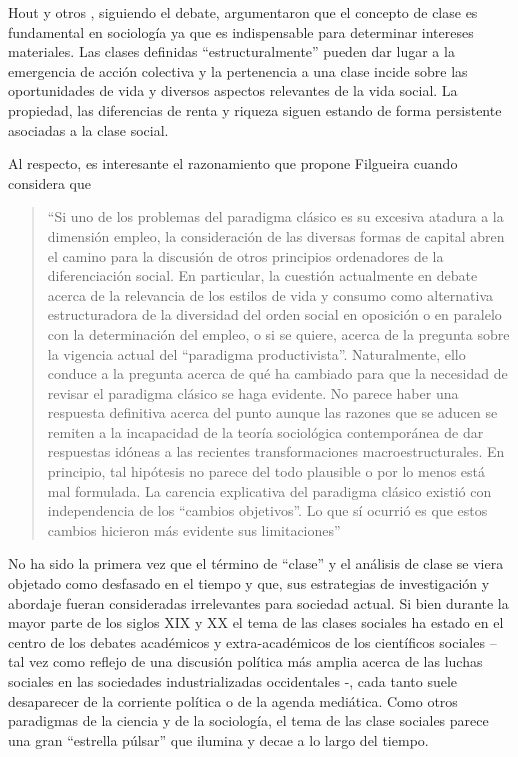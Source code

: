 \documentclass[
]{book}
\begin{document}
Hout y otros \citeyearpar{Hout1993}, siguiendo el debate, argumentaron que el concepto de clase es fundamental en sociología ya que es indispensable para determinar intereses materiales. Las clases definidas ``estructuralmente'' pueden dar lugar a la emergencia de acción colectiva y la pertenencia a una clase incide sobre las oportunidades de vida y diversos aspectos relevantes de la vida social. La propiedad, las diferencias de renta y riqueza siguen estando de forma persistente asociadas a la clase social.

Al respecto, es interesante el razonamiento que propone Filgueira cuando considera que

\begin{quote}
``Si uno de los problemas del paradigma clásico es su excesiva atadura a la dimensión empleo, la consideración de las diversas formas de capital abren el camino para la discusión de otros principios ordenadores de la diferenciación social. En particular, la cuestión actualmente en debate acerca de la relevancia de los estilos de vida y consumo como alternativa estructuradora de la diversidad del orden social en oposición o en paralelo con la determinación del empleo, o si se quiere, acerca de la pregunta sobre la vigencia actual del ``paradigma productivista''. Naturalmente, ello conduce a la pregunta acerca de qué ha cambiado para que la necesidad de revisar el paradigma clásico se haga evidente. No parece haber una respuesta definitiva acerca del punto aunque las razones que se aducen se remiten a la incapacidad de la teoría sociológica contemporánea de dar respuestas idóneas a las recientes transformaciones macroestructurales. En principio, tal hipótesis no parece del todo plausible o por lo menos está mal formulada. La carencia explicativa del paradigma clásico existió con independencia de los ``cambios objetivos''. Lo que sí ocurrió es que estos cambios hicieron más evidente sus limitaciones'' \citep[p.~22]{Filgueira2001}
\end{quote}

No ha sido la primera vez que el término de ``clase'' y el análisis de clase se viera objetado como desfasado en el tiempo y que, sus estrategias de investigación y abordaje fueran consideradas irrelevantes para sociedad actual. Si bien durante la mayor parte de los siglos XIX y XX el tema de las clases sociales ha estado en el centro de los debates académicos y extra-académicos de los científicos sociales --tal vez como reflejo de una discusión política más amplia acerca de las luchas sociales en las sociedades industrializadas occidentales \citep{Bauman2000, Furbanck2005}-, cada tanto suele desaparecer de la corriente política o de la agenda mediática. Como otros paradigmas de la ciencia y de la sociología, el tema de las clase sociales parece una gran ``estrella púlsar'' que ilumina y decae a lo largo del tiempo.
\end{document}

